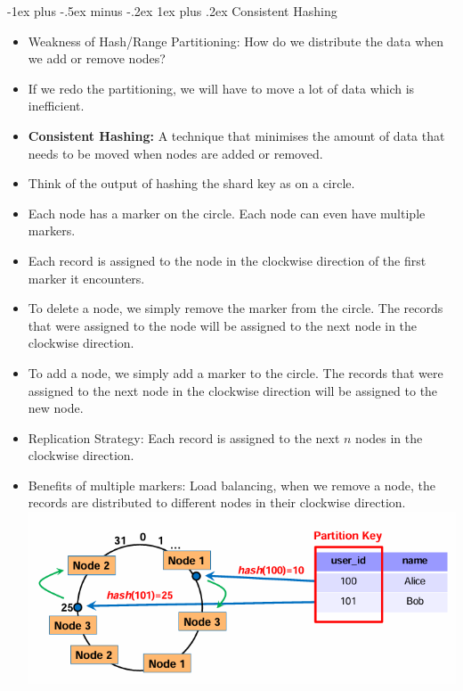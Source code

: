 \documentclass[10pt, landscape]{article}
\makeatletter
\renewcommand{\subsubsection}{\@startsection{subsubsection}{3}{0mm}%
  {-1ex plus -.5ex minus -.2ex}%
  {1ex plus .2ex}%
{\normalfont\small\bfseries}}%
\makeatother
\begin{document}
\begin{multicols*}{4}
  \subsubsection{Consistent Hashing}
  \begin{itemize}
    \item Weakness of Hash/Range Partitioning: How do we distribute the data when we add or remove nodes?
    \item If we redo the partitioning, we will have to move a lot of data which is inefficient.
    \item \textbf{Consistent Hashing:} A technique that minimises the amount of data that needs to be moved when nodes are added or removed.
    \item Think of the output of hashing the shard key as on a circle.
    \item Each node has a marker on the circle. Each node can even have multiple markers.
    \item Each record is assigned to the node in the clockwise direction of the first marker it encounters.
    \item To delete a node, we simply remove the marker from the circle. The records that were assigned to the node will be assigned to the next node in the clockwise direction.
    \item To add a node, we simply add a marker to the circle. The records that were assigned to the next node in the clockwise direction will be assigned to the new node.
    \item Replication Strategy: Each record is assigned to the next $n$ nodes in the clockwise direction.
    \item Benefits of multiple markers: Load balancing, when we remove a node, the records are distributed to different nodes in their clockwise direction.
          \includegraphics[width=0.95\linewidth]{consistent_hashing.png}
  \end{itemize}
  


\end{multicols*}
\end{document}
